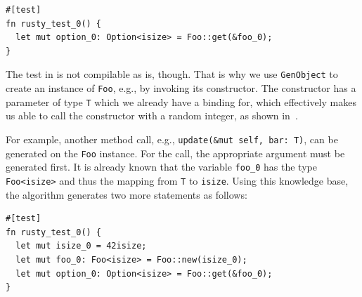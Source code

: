 \documentclass[paper=a4,%
  twoside,%
  BCOR4mm,%
  abstract=true,%
  toc=bibliography,%
  chapterprefix=true,%
  toc=bibliographynumbered,%
  open=right,%
  english,%
  pagesize=pdftex]{scrreprt}
\begin{document}
\begin{lstlisting}[style=boxed, caption={}, label=lst:building-generic-test-1]
#[test]
fn rusty_test_0() {
  let mut option_0: Option<isize> = Foo::get(&foo_0);
}
\end{lstlisting}
The test in  is not compilable as is, though. That is why we use \texttt{GenObject} to create an instance of \texttt{Foo}, e.g., by invoking its constructor. The constructor has a parameter of type \texttt{T} which we already have a binding for, which effectively makes us able to call the constructor with a random integer, as shown in~.

For example, another method call, e.g., \texttt{update(\string&mut self, bar: T)}, can be generated on the \texttt{Foo} instance. For the call, the appropriate argument must be generated first. It is already known that the variable \texttt{foo\string_0} has the type \texttt{Foo<isize>} and thus the mapping from \texttt{T} to \texttt{isize}. Using this knowledge base, the algorithm generates two more statements as follows:

\begin{lstlisting}[style=boxed, caption={}, label=lst:building-generic-test-2]
#[test]
fn rusty_test_0() {
  let mut isize_0 = 42isize;
  let mut foo_0: Foo<isize> = Foo::new(isize_0);
  let mut option_0: Option<isize> = Foo::get(&foo_0);
}
\end{lstlisting}


\end{document}
